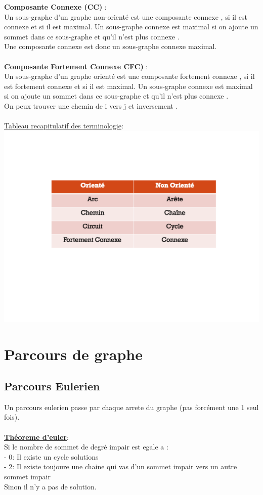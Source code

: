 \documentclass[a4paper,12pt,openany]{book}
\begin{document}
\textbf{Composante Connexe (CC)} :\\
Un sous-graphe d'un graphe non-orienté est une composante connexe , si il est connexe et si il est maximal. Un sous-graphe connexe est maximal si on ajoute un sommet dans ce sous-graphe et qu'il n'est plus connexe .\\
Une composante connexe est donc un sous-graphe connexe maximal.\\
\\
\textbf{Composante Fortement Connexe CFC)} :\\
Un sous-graphe d'un graphe orienté est une composante fortement connexe , si il est fortement connexe et si il est maximal. Un sous-graphe connexe est maximal si on ajoute un sommet dans ce sous-graphe et qu'il n'est plus connexe .\\
On peux trouver une chemin de i vers j et inversement .\\
\\
\underline{Tableau recapitulatif des terminologie}:\\
\includegraphics[width=0.75\linewidth,center]{img/tab-graphe-(non)oriente.png}


\chapter{Parcours de graphe}

\section{Parcours Eulerien}

Un parcours eulerien passe par chaque arrete du graphe (pas forcément une 1 seul fois).\\
\\
\underline{\textbf{Théoreme d'euler}}: \\
Si le nombre de sommet de degré impair est egale a :\\
- 0: Il existe un cycle solutions\\
- 2: Il existe toujoure une chaine qui vas d'un sommet impair vers un autre sommet impair\\
Sinon il n'y a pas de solution.\\
\end{document}

